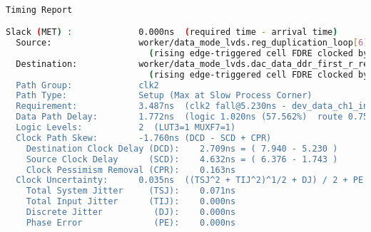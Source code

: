 \documentclass{article}
\begin{document}
\begin{lstlisting}[language=bash]

Timing Report

Slack (MET) :             0.000ns  (required time - arrival time)
  Source:                 worker/data_mode_lvds.reg_duplication_loop[6].dacd2_ch0_i_r_reg[6]/C
                            (rising edge-triggered cell FDRE clocked by dev_data_ch1_in_out[dac_clk]  {rise@1.743ns fall@5.230ns period=6.974ns})
  Destination:            worker/data_mode_lvds.dac_data_ddr_first_r_reg[0]/D
                            (rising edge-triggered cell FDRE clocked by clk2'  {rise@0.000ns fall@1.743ns period=3.487ns})
  Path Group:             clk2
  Path Type:              Setup (Max at Slow Process Corner)
  Requirement:            3.487ns  (clk2 fall@5.230ns - dev_data_ch1_in_out[dac_clk] rise@1.743ns)
  Data Path Delay:        1.772ns  (logic 1.020ns (57.562%)  route 0.752ns (42.438%))
  Logic Levels:           2  (LUT3=1 MUXF7=1)
  Clock Path Skew:        -1.760ns (DCD - SCD + CPR)
    Destination Clock Delay (DCD):    2.709ns = ( 7.940 - 5.230 ) 
    Source Clock Delay      (SCD):    4.632ns = ( 6.376 - 1.743 ) 
    Clock Pessimism Removal (CPR):    0.163ns
  Clock Uncertainty:      0.035ns  ((TSJ^2 + TIJ^2)^1/2 + DJ) / 2 + PE
    Total System Jitter     (TSJ):    0.071ns
    Total Input Jitter      (TIJ):    0.000ns
    Discrete Jitter          (DJ):    0.000ns
    Phase Error              (PE):    0.000ns


\end{lstlisting}
\end{document}
